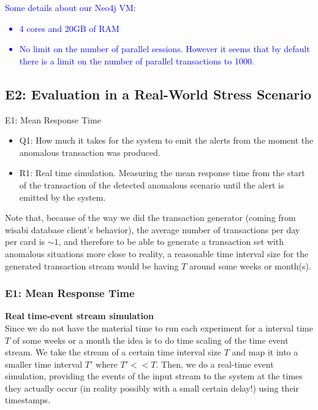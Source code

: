 \textcolor{blue}{Some details about our Neo4j VM:
\begin{itemize}
    \item 4 cores and 20GB of RAM
    \item No limit on the number of parallel sessions. However it seems that by default there is a limit on the number of parallel transactions to 1000.
\end{itemize}
}

\subsection*{E2: Evaluation in a Real-World Stress Scenario}


E1: Mean Response Time

\begin{itemize}
  \item Q1: How much it takes for the system to emit the alerts from the moment the anomalous transaction was produced.
  \item R1: Real time simulation. Measuring the mean response time from the start of the transaction of the detected anomalous scenario until the alert is emitted by the system.
\end{itemize}


Note that, because of the way we did the transaction generator (coming from wisabi database client's behavior), the average number of transactions per day per card is $\sim1$, and therefore to be able to generate a transaction set with anomalous situations more close to reality, a reasonable time interval size for the generated transaction stream would be having $T$ around some weeks or month(s).

\subsubsection{E1: Mean Response Time}

\textbf{Real time-event stream simulation\\}
Since we do not have the material time to run each experiment for a interval time $T$ of some weeks or a month the idea is to do time scaling of the time event stream. We take the stream of a certain time interval size $T$ and map it into a smaller time interval
$T'$ where $T' << T$. Then, we do a real-time event simulation, providing the events of the input stream to the system at the times they actually occur (in reality possibly with a small certain delay!) using their timestamps.

